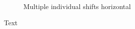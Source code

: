 \begin{figure}[t]
\begin{subfigure}{.47\textwidth}
        \caption{Multiple individual shifts horizontal}
        \label{fig:multiple_shift_horizontal_tiling}
    \end{subfigure}
    \caption{Text}
    \label{fig:tiling_figures}
\end{figure}
